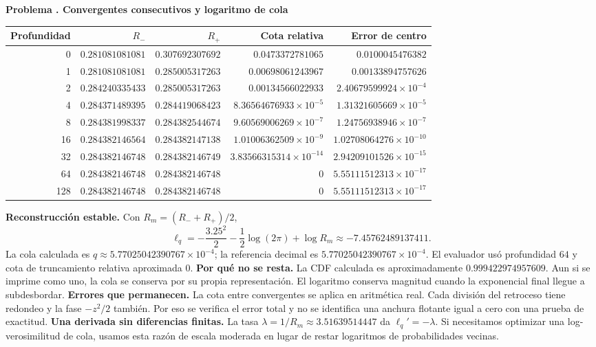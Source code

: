 \documentclass[11pt,a4paper]{article}
\theoremstyle{definition}
\newcounter{problema}
\newenvironment{resuelto}[1]{\refstepcounter{problema}\par\medskip\Needspace{6\baselineskip}\textbf{Problema \theproblema. #1}\par}{\par\medskip}
\begin{document}
\begin{resuelto}{Convergentes consecutivos y logaritmo de cola}
\begin{center}\small\begin{tabular}{rrrrr}
\toprule
Profundidad&$R_-$&$R_+$&Cota relativa&Error de centro\\
\midrule
0&$0.281081081081$&$0.307692307692$&$0.0473372781065$&$0.0100045476382$\\
1&$0.281081081081$&$0.285005317263$&$0.00698061243967$&$0.00133894757626$\\
2&$0.284240335433$&$0.285005317263$&$0.00134566022933$&$2.40679599924\times10^{-4}$\\
4&$0.284371489395$&$0.284419068423$&$8.36564676933\times10^{-5}$&$1.31321605669\times10^{-5}$\\
8&$0.284381998337$&$0.284382544674$&$9.60569006269\times10^{-7}$&$1.24756938946\times10^{-7}$\\
16&$0.284382146564$&$0.284382147138$&$1.01006362509\times10^{-9}$&$1.02708064276\times10^{-10}$\\
32&$0.284382146748$&$0.284382146749$&$3.83566315314\times10^{-14}$&$2.94209101526\times10^{-15}$\\
64&$0.284382146748$&$0.284382146748$&$0$&$5.55111512313\times10^{-17}$\\
128&$0.284382146748$&$0.284382146748$&$0$&$5.55111512313\times10^{-17}$\\
\bottomrule\end{tabular}\end{center}
\textbf{Reconstrucción estable.} Con $R_m=(R_-+R_+)/2$,
\[
\ell_q=-\frac{3.25^2}{2}-\frac12\log(2\pi)+\log R_m\approx-7.45762489137411.
\]
La cola calculada es $q\approx5.77025042390767\times10^{-4}$; la referencia decimal es $5.77025042390767\times10^{-4}$. El evaluador usó profundidad $64$ y cota de truncamiento relativa aproximada $0$.
\textbf{Por qué no se resta.} La CDF calculada es aproximadamente $0.999422974957609$. Aun si se imprime como uno, la cola se conserva por su propia representación. El logaritmo conserva magnitud cuando la exponencial final llegue a subdesbordar.
\textbf{Errores que permanecen.} La cota entre convergentes se aplica en aritmética real. Cada división del retroceso tiene redondeo y la fase $-z^2/2$ también. Por eso se verifica el error total y no se identifica una anchura flotante igual a cero con una prueba de exactitud.
\textbf{Una derivada sin diferencias finitas.} La tasa $\lambda=1/R_m\approx3.51639514447$ da $\ell_q\prime=-\lambda$. Si necesitamos optimizar una log-verosimilitud de cola, usamos esta razón de escala moderada en lugar de restar logaritmos de probabilidades vecinas.
\end{resuelto}
\end{document}
